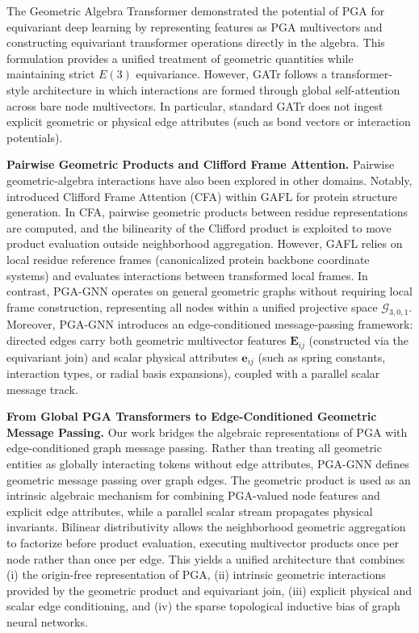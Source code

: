\documentclass[10pt]{article}
\begin{document}
The Geometric Algebra Transformer \citep[GATr;][]{gatr} demonstrated the potential of PGA for equivariant deep learning by representing features as PGA multivectors and constructing equivariant transformer operations directly in the algebra. This formulation provides a unified treatment of geometric quantities while maintaining strict $E(3)$ equivariance. However, GATr follows a transformer-style architecture in which interactions are formed through global self-attention across bare node multivectors. In particular, standard GATr does not ingest explicit geometric or physical edge attributes (such as bond vectors or interaction potentials).

\noindent\textbf{Pairwise Geometric Products and Clifford Frame Attention.}
Pairwise geometric-algebra interactions have also been explored in other domains. Notably, \citet{gafl} introduced Clifford Frame Attention (CFA) within GAFL for protein structure generation. In CFA, pairwise geometric products between residue representations are computed, and the bilinearity of the Clifford product is exploited to move product evaluation outside neighborhood aggregation. However, GAFL relies on local residue reference frames (canonicalized protein backbone coordinate systems) and evaluates interactions between transformed local frames. In contrast, PGA-GNN operates on general geometric graphs without requiring local frame construction, representing all nodes within a unified projective space $\mathcal{G}_{3,0,1}$. Moreover, PGA-GNN introduces an edge-conditioned message-passing framework: directed edges carry both geometric multivector features $\mathbf{E}_{ij}$ (constructed via the equivariant join) and scalar physical attributes $\mathbf{e}_{ij}$ (such as spring constants, interaction types, or radial basis expansions), coupled with a parallel scalar message track.

\noindent\textbf{From Global PGA Transformers to Edge-Conditioned Geometric Message Passing.}
Our work bridges the algebraic representations of PGA with edge-conditioned graph message passing. Rather than treating all geometric entities as globally interacting tokens without edge attributes, \textsc{PGA-GNN} defines geometric message passing over graph edges. The geometric product is used as an intrinsic algebraic mechanism for combining PGA-valued node features and explicit edge attributes, while a parallel scalar stream propagates physical invariants. Bilinear distributivity allows the neighborhood geometric aggregation to factorize before product evaluation, executing multivector products once per node rather than once per edge. This yields a unified architecture that combines (i) the origin-free representation of PGA, (ii) intrinsic geometric interactions provided by the geometric product and equivariant join, (iii) explicit physical and scalar edge conditioning, and (iv) the sparse topological inductive bias of graph neural networks.
\end{document}
